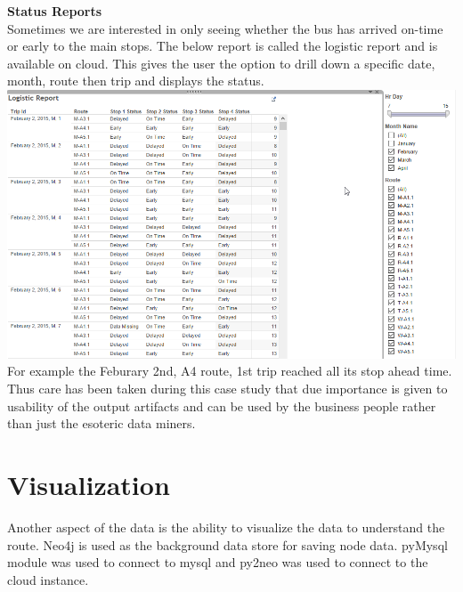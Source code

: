 \documentclass[12pt]{article}\usepackage[]{graphicx}\usepackage[]{color}
\begin{document}
\textbf{Status Reports}\\
Sometimes we are interested in only seeing  whether the bus has arrived on-time or early to the main stops. The below report is called the logistic report and is available on cloud. This gives the user the option to drill down a specific date, month, route then trip and displays the status.\\
\includegraphics[scale=0.5]{resources/tableau6}\\[1cm] 
For example the Feburary 2nd, A4 route, 1st trip reached all its stop ahead time.\\

Thus care has been taken during this case study that due importance is given to usability of the output artifacts and can be used by the business people rather than just the esoteric data miners.
\section{Visualization}
Another aspect of the data is the ability to visualize the data to understand the route. Neo4j is used as the background data store for saving node data. pyMysql module was used to connect to mysql and py2neo was used to connect to the cloud instance.\\
\end{document}
